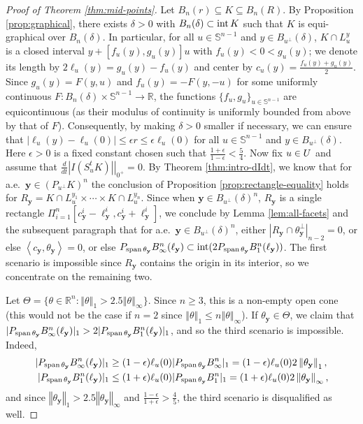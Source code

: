 \documentclass[11pt]{article}
\theoremstyle{definition}
\theoremstyle{proof}
\newcommand{\dt}[1]{\left . \frac{d}{dt} #1 \right |_{0^+}}
\DeclareMathOperator{\+}{\mathop{\tilde{+}}}
\DeclareMathOperator{\interior}{\textnormal{int}}
\DeclareMathOperator{\sspan}{\textnormal{span}}
\newcommand{\norm}[1]{\left\Vert#1\right\Vert}
\newcommand{\abs}[1]{\left\vert#1\right\vert}
\newcommand{\scalar}[1]{\left \langle #1 \right \rangle}
\newcommand{\R}{\mathbb{R}}
\renewcommand{\S}{\mathbb{S}}
\newcommand{\y}{\mathbf{y}}
\newcommand{\eps}{\epsilon}
\newcommand{\h}{\ell}
\numberwithin{equation}{section}
\numberwithin{equation}{section}
\begin{document}
\begin{proof}[Proof of Theorem \ref{thm:mid-points}]
Let $B_n(r) \subseteq K \subseteq B_n(R)$. 
By Proposition \ref{prop:graphical}, there exists $\delta >0 $ with $B_n(\delta) \subset \interior K$ such that $K$ is equi-graphical over $B_n(\delta)$. In particular, for all $u \in \S^{n-1}$ and $y \in B_{u^{\perp}}(\delta)$, $K \cap L_u^y$ is a closed interval $y + [f_u(y),g_u(y)] u$ with $f_u(y) < 0 < g_u(y)$; we denote its length by $2 \h_u(y) = g_u(y) - f_u(y)$ and center by $c_u(y) = \frac{f_u(y) + g_u(y)}{2}$. Since $g_u(y) = F(y,u)$ and $f_u(y) = -F(y,-u)$ for some uniformly continuous $F : B_n(\delta) \times \S^{n-1} \rightarrow \R$, the functions $\{f_u, g_u\}_{u \in \S^{n-1}}$ are equicontinuous (as their modulus of continuity is uniformly bounded from above by that of $F$). Consequently, by making $\delta > 0$ smaller if necessary, we can ensure that $\abs{\h_u(y) - \h_u(0)}\leq \eps r \leq \eps \h_u(0)$ for all $u \in \S^{n-1}$ and $y \in B_{u^{\perp}}(\delta)$. Here $\eps > 0$ is a fixed constant chosen such that $\frac{1+\eps}{1-\eps} < \frac{5}{4}$. 
Now fix $u \in U$ and assume that $\dt{|I(S_u^t K)|}= 0$. By Theorem \ref{thm:intro-dIdt}, we know that for a.e.~$\y \in (P_{u^{\perp}} K)^n$ the conclusion of Proposition \ref{prop:rectangle-equality} holds for $R_\y= K \cap L_u^{y_1} \times \cdots \times  K \cap L_u^{y_n}$. Since when $\y \in B_{u^{\perp}}(\delta)^n$, $R_\y$ is a single rectangle $\Pi_{i=1}^n [c^i_\y - \h^i_\y , c^i_\y + \h^i_\y]$, we conclude by Lemma \ref{lem:all-facets} and the subsequent paragraph that for a.e.~$\y \in B_{u^{\perp}}(\delta)^n$, either $|R_\y \cap \theta_\y^{\perp}|_{n-2} = 0$, or else $\scalar{c_\y , \theta_\y} = 0$, or else $P_{\sspan \theta_\y} B^n_\infty(\h_\y) \subset \interior (2 P_{\sspan \theta_\y} B^n_1(\h_\y))$. The first scenario is impossible since $R_\y$ contains the origin in its interior, so we concentrate on the remaining two.

Let $\Theta = \{ \theta \in \R^n : \norm{\theta}_{1} > 2.5 \norm{\theta}_{\infty} \}$. Since $n \geq 3$, this is a non-empty open cone (this would not be the case if $n=2$ since $\norm{\theta}_{1} \leq n \norm{\theta}_{\infty}$). If $\theta_\y \in \Theta$, we claim that $|P_{\sspan \theta_\y} B^n_\infty(\h_\y) |_1 > 2 |P_{\sspan \theta_\y} B^n_1(\h_\y)|_1$, and so the third scenario is impossible. Indeed,
\begin{align*}
 |P_{\sspan \theta_\y} B^n_\infty(\h_\y)|_1 &  \geq (1-\eps) \h_u(0) |P_{\sspan \theta_\y} B_\infty^n|_1 = (1-\eps) \h_u(0) 2 \norm{\theta_\y}_{1} ,\\
|P_{\sspan \theta_\y} B^n_1(\h_\y)|_1 & \leq  (1+\eps) \h_u(0)  |P_{\sspan \theta_\y} B^n_1|_1 = (1+\eps) \h_u(0) 2 \norm{\theta_\y}_{\infty} ,
\end{align*}
and since $\norm{\theta_\y}_{1} > 2.5 \norm{\theta_\y}_{\infty}$ and $\frac{1-\eps}{1+\eps} > \frac{4}{5}$, the third scenario is disqualified as well.


\end{proof}
\end{document}

